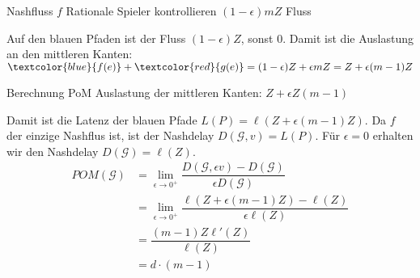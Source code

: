 \documentclass{beamer}
\begin{document}
\begin{frame}{Nashfluss $f$}
	Rationale Spieler kontrollieren $(1- \epsilon)mZ$ Fluss
	\begin{figure}
	\end{figure}
	Auf den blauen Pfaden ist der Fluss $(1- \epsilon)Z$, sonst $0$. Damit ist die Auslastung an den mittleren Kanten: $\textcolor{blue}{f(e)} + \textcolor{red}{g(e)} = (1 - \epsilon)Z + \epsilon m Z = Z + \epsilon (m-1) Z$
\end{frame}

\begin{frame}{Berechnung PoM}
	Auslastung der mittleren Kanten: $Z + \epsilon Z (m-1)$
	
	Damit ist die Latenz der blauen Pfade $L(P) = \ell (Z + \epsilon (m-1) Z)$.
	Da $f$ der einzige Nashflus ist, ist der Nashdelay $D(\mathcal G, v) = L(P)$.
	Für $\epsilon = 0$ erhalten wir den Nashdelay $D(\mathcal G) = \ell(Z)$.
	\begin{align*}
		POM(\mathcal G) &= \lim_{\epsilon \to 0^+} \dfrac{D(\mathcal G, \epsilon v) - D(\mathcal G)}{\epsilon D(\mathcal G)} \\
			&= \lim_{\epsilon \to 0^+} \dfrac{\ell (Z + \epsilon (m-1) Z) - \ell(Z)}{\epsilon \ell(Z)} \\
			&= \dfrac{(m - 1) Z \ell'(Z)}{\ell(Z)} \\
			&= d \cdot (m - 1)
	\end{align*}
\end{frame}
\end{document}

